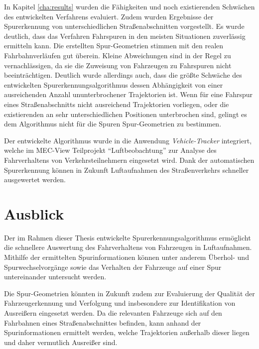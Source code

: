 In Kapitel \ref{cha:results} wurden die Fähigkeiten und noch existierenden Schwächen des entwickelten
Verfahrens evaluiert. Zudem wurden Ergebnisse der Spurerkennung von unterschiedlichen Straßenabschnitten
vorgestellt. Es wurde deutlich, dass das Verfahren Fahrspuren in den meisten Situationen zuverlässig
ermitteln kann. Die erstellten Spur-Geometrien stimmen mit den realen Fahrbahnverläufen gut überein.
Kleine Abweichungen sind in der Regel zu vernachlässigen, da sie die Zuweisung von Fahrzeugen zu Fahrspuren
nicht beeinträchtigen.
Deutlich wurde allerdings auch, dass die größte Schwäche des entwickelten Spurerkennungsalgorithmus
dessen Abhängigkeit von einer ausreichenden Anzahl ununterbrochener Trajektorien ist. Wenn für eine
Fahrspur eines Straßenabschnitts nicht ausreichend Trajektorien vorliegen, oder die existierenden an sehr
unterschiedlichen Positionen unterbrochen sind, gelingt es dem Algorithmus nicht für die Spuren
Spur-Geometrien zu bestimmen.

Der entwickelte Algorithmus wurde in die Anwendung \textit{Vehicle-Tracker} integriert,
welche im MEC-View Teilprojekt ``Luftbeobachtung'' zur Analyse des Fahrverhaltens von Verkehrsteilnehmern
eingesetzt wird. Dank der automatischen Spurerkennung können in Zukunft Luftaufnahmen des Straßenverkehrs
schneller ausgewertet werden.

\section{Ausblick}

Der im Rahmen dieser Thesis entwickelte Spurerkennungsalgorithmus ermöglicht die schnellere Auswertung
des Fahrverhaltens von Fahrzeugen in Luftaufnahmen. Mithilfe der ermittelten Spurinformationen können
unter anderem Überhol- und Spurwechselvorgänge sowie das Verhalten der Fahrzeuge auf einer Spur
untereinander untersucht werden.

Die Spur-Geometrien könnten in Zukunft zudem zur Evaluierung der Qualität der Fahrzeugerkennung und Verfolgung
und insbesondere zur Identifikation von Ausreißern eingesetzt werden. Da die relevanten Fahrzeuge sich
auf den Fahrbahnen eines Straßenabschnittes befinden, kann anhand der Spurinformationen ermittelt werden, 
welche Trajektorien außerhalb dieser liegen und daher vermutlich Ausreißer sind.

